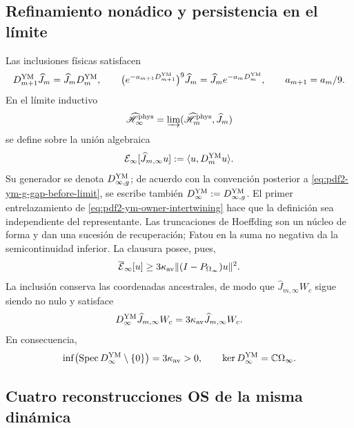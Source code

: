 \subsection{Refinamiento nonádico y persistencia en el límite}

Las inclusiones físicas satisfacen
\begin{equation}\label{eq:pdf2-ym-owner-intertwining}
 D_{m+1}^{\rm YM}\widehat J_m
 =\widehat J_mD_m^{\rm YM},\qquad
 \bigl(e^{-a_{m+1}D_{m+1}^{\rm YM}}\bigr)^9\widehat J_m
 =\widehat J_me^{-a_mD_m^{\rm YM}},\qquad a_{m+1}=a_m/9.
\end{equation}
En el límite inductivo
\begin{equation}\label{eq:pdf2-ym-owner-inductive-limit}
 \widehat{\mathscr H}_\infty^{\rm phys}
 =\varinjlim(\widehat{\mathscr H}_m^{\rm phys},\widehat J_m)
\end{equation}
se define sobre la unión algebraica
\begin{equation}\label{eq:pdf2-ym-owner-limit-form}
 \mathcal E_\infty[\widehat J_{m,\infty}u]
 :=\langle u,D_m^{\rm YM}u\rangle.
\end{equation}
Su generador se denota
$D_{\infty,g}^{\rm YM}$; de acuerdo con la convención posterior a
\eqref{eq:pdf2-ym-g-gap-before-limit}, se escribe también
$D_\infty^{\rm YM}:=D_{\infty,g}^{\rm YM}$.
El primer entrelazamiento de \eqref{eq:pdf2-ym-owner-intertwining} hace que la
definición sea independiente del representante. Las truncaciones de Hoeffding son
un núcleo de forma y dan una sucesión de recuperación; Fatou en la suma no negativa
da la semicontinuidad inferior. La clausura posee, pues,
\begin{equation}\label{eq:pdf2-ym-owner-limit-gap}
 \overline{\mathcal E}_\infty[u]
 \ge3\kappa_{\rm av}\|(I-P_{\Omega_\infty})u\|^2.
\end{equation}
La inclusión conserva las coordenadas ancestrales, de modo que
$\widehat J_{m,\infty}W_c$ sigue siendo no nulo y satisface
\begin{equation}\label{eq:pdf2-ym-owner-limit-witness}
 D_\infty^{\rm YM}\widehat J_{m,\infty}W_c
 =3\kappa_{\rm av}\widehat J_{m,\infty}W_c.
\end{equation}
En consecuencia,
\begin{equation}\label{eq:pdf2-ym-owner-exact-gap}
 \inf\bigl(\operatorname{Spec}D_\infty^{\rm YM}\setminus\{0\}\bigr)
 =3\kappa_{\rm av}>0,
 \qquad \ker D_\infty^{\rm YM}=\mathbb C\Omega_\infty.
\end{equation}

\subsection{Cuatro reconstrucciones OS de la misma dinámica}

